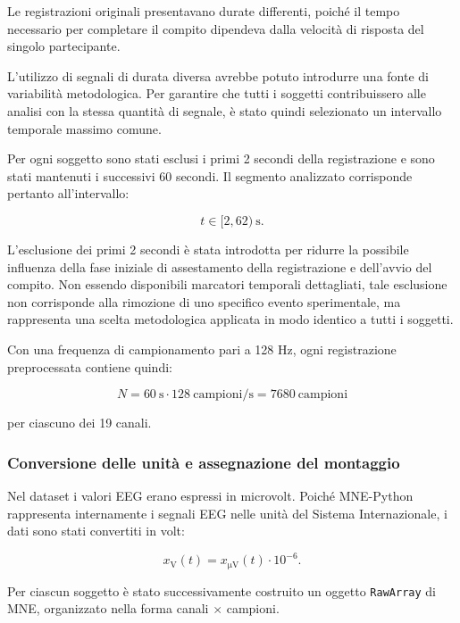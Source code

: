 Le registrazioni originali presentavano durate differenti, poiché il
tempo necessario per completare il compito dipendeva dalla velocità
di risposta del singolo partecipante.

L'utilizzo di segnali di durata diversa avrebbe potuto introdurre una
fonte di variabilità metodologica. Per garantire che tutti i
soggetti contribuissero alle analisi con la stessa quantità di
segnale, è stato quindi selezionato un intervallo temporale massimo comune.

Per ogni soggetto sono stati esclusi i primi 2 secondi della
registrazione e sono stati mantenuti i successivi 60 secondi. Il
segmento analizzato corrisponde pertanto all'intervallo:

\begin{equation}
	t \in [2,62)\ \mathrm{s}.
\end{equation}

L'esclusione dei primi 2 secondi è stata introdotta per ridurre la
possibile influenza della fase iniziale di assestamento della
registrazione e dell'avvio del compito. Non essendo disponibili
marcatori temporali dettagliati, tale esclusione non corrisponde alla
rimozione di uno specifico evento sperimentale, ma rappresenta una
scelta metodologica applicata in modo identico a tutti i soggetti.

Con una frequenza di campionamento pari a 128 Hz, ogni registrazione
preprocessata contiene quindi:

\begin{equation}
	N
	=
	60\ \mathrm{s}
	\cdot
	128\ \mathrm{campioni/s}
	=
	7680\ \mathrm{campioni}
\end{equation}

per ciascuno dei 19 canali.


\subsubsection{Conversione delle unità e assegnazione del montaggio}

Nel dataset i valori EEG erano espressi in microvolt. Poiché
MNE-Python rappresenta internamente i segnali EEG nelle unità del
Sistema Internazionale, i dati sono stati convertiti in volt:

\begin{equation}
	x_{\mathrm{V}}(t)
	=
	x_{\mathrm{\mu V}}(t)
	\cdot 10^{-6}.
\end{equation}

Per ciascun soggetto è stato successivamente costruito un oggetto
\texttt{RawArray} di MNE, organizzato nella forma
canali $\times$ campioni.

